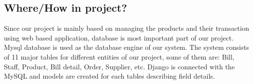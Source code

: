 \subsection{Where/How in project?}

Since our project is mainly based on
managing the products and their transaction using web based application,
database is most important part of our project. Mysql database is used as
the database engine of our system. The system consists of 11 major tables
for different entities of our project, some of them are: Bill, Staff,
Product, Bill detail, Order, Supplier, etc. Django is connected with the
MySQL and models are created for each tables describing field details.

